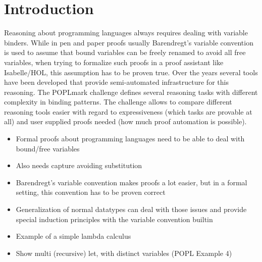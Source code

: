 \chapter{Introduction}\label{chapter:introduction}

Reasoning about programming languages always requires dealing with variable binders. While in pen and paper proofs usually Barendregt's variable convention\cite{variable_convention} is used to assume that bound variables can be freely renamed to avoid all free variables, when trying to formalize such proofs in a proof assistant like Isabelle/HOL\cite{isabelle}, this assumption has to be proven true.
Over the years several tools have been developed that provide semi-automated infrastructure for this reasoning. The POPLmark challenge\cite{poplmark} defines several reasoning tasks with different complexity in binding patterns. The challenge allows to compare different reasoning tools easier with regard to expressiveness (which tasks are provable at all) and user supplied proofs needed (how much proof automation is possible).

\begin{itemize}
\item{Formal proofs about programming languages need to be able to deal with bound/free variables}
\item{Also needs capture avoiding substitution}
\item{Barendregt's variable convention makes proofs a lot easier, but in a formal setting, this convention has to be proven correct}
\item{Generalization of normal datatypes can deal with those issues and provide special induction principles with the variable convention builtin}
\item{Example of a simple lambda calculus}
\item{Show multi (recursive) let, with distinct variables (POPL Example 4)}
\end{itemize}
